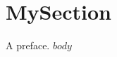 \documentclass{template-uchile/tesis-uchile}
\begin{document}
\frontmatter
\tableofcontents
\mainmatter
\section*{MySection}
A preface.
$body$
\nocite{*} 
\printbibliography
\appendix
\end{document}
